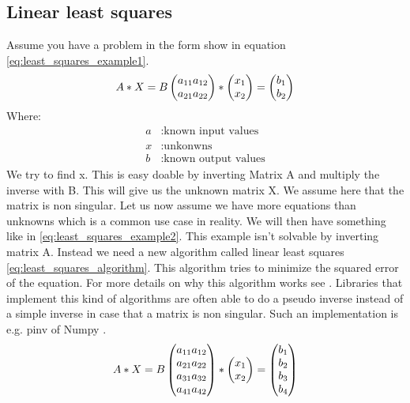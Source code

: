 \documentclass[11pt,a4paper,titlepage,oneside]{report}
\begin{document}
\subsection{Linear least squares}
Assume you have a problem in the form show in equation \ref{eq:least_squares_example1}.
\begin{equation}\label{eq:least_squares_example1}
  A*X=B \\ 
  \begin{pmatrix}
    a_{11} a_{12} \\
    a_{21} a_{22}
  \end{pmatrix}*
  \begin{pmatrix}
    x_1 \\
    x_2
  \end{pmatrix}=
  \begin{pmatrix}
    b_1 \\
    b_2
  \end{pmatrix}
\end{equation}
Where:
\begin{align*}
  a		  &: \text{known input values}\\
  x	  	&: \text{unkonwns}\\
  b		  &: \text{known output values}
\end{align*}
We try to find x. This is easy doable by inverting Matrix A and multiply the inverse with B. This will give us the unknown matrix X. We assume here that the matrix is non singular. Let us now assume we have more equations than unknowns which is a common use case in reality. We will then have something like in \ref{eq:least_squares_example2}. This example isn't solvable by inverting matrix A. Instead we need a new algorithm called linear least squares \ref{eq:least_squares_algorithm}. This algorithm tries to minimize the squared error of the equation. For more details on why this algorithm works see \cite{Monson}. Libraries that implement this kind of algorithms are often able to do a pseudo inverse instead of a simple inverse in case that a matrix is non singular. Such an implementation is e.g. pinv of Numpy \cite{pinv}.
\begin{equation}\label{eq:least_squares_example2}
  A*X=B \\ 
  \begin{pmatrix}
    a_{11} a_{12} \\
    a_{21} a_{22} \\
    a_{31} a_{32} \\
    a_{41} a_{42}
  \end{pmatrix}*
  \begin{pmatrix}
    x_1 \\
    x_2
  \end{pmatrix}=
  \begin{pmatrix}
    b_1 \\
    b_2 \\
    b_3 \\
    b_4
  \end{pmatrix}
\end{equation}
\end{document}
